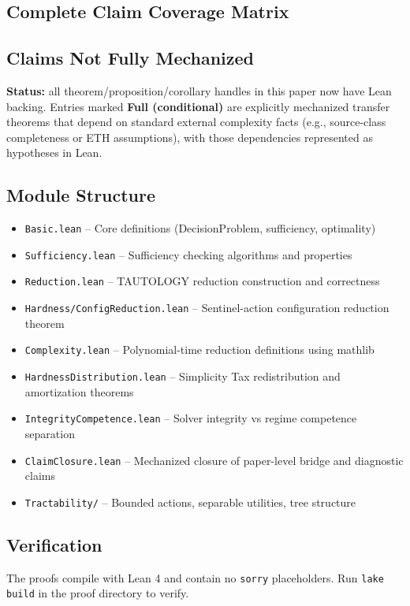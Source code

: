 \subsection{Complete Claim Coverage Matrix}

\subsection{Claims Not Fully Mechanized}

\textbf{Status:} all theorem/proposition/corollary handles in this paper now have Lean backing.
Entries marked \textbf{Full (conditional)} are explicitly mechanized transfer theorems that depend on standard external complexity facts (e.g., source-class completeness or ETH assumptions), with those dependencies represented as hypotheses in Lean.

\subsection{Module Structure}

\begin{itemize}
\item \texttt{Basic.lean} -- Core definitions (DecisionProblem, sufficiency, optimality)
\item \texttt{Sufficiency.lean} -- Sufficiency checking algorithms and properties
\item \texttt{Reduction.lean} -- TAUTOLOGY reduction construction and correctness
\item \texttt{Hardness/ConfigReduction.lean} -- Sentinel-action configuration reduction theorem
\item \texttt{Complexity.lean} -- Polynomial-time reduction definitions using mathlib
\item \texttt{HardnessDistribution.lean} -- Simplicity Tax redistribution and amortization theorems
\item \texttt{IntegrityCompetence.lean} -- Solver integrity vs regime competence separation
\item \texttt{ClaimClosure.lean} -- Mechanized closure of paper-level bridge and diagnostic claims
\item \texttt{Tractability/} -- Bounded actions, separable utilities, tree structure
\end{itemize}

\subsection{Verification}

The proofs compile with Lean 4 and contain no \texttt{sorry} placeholders. Run \texttt{lake build} in the proof directory to verify.
